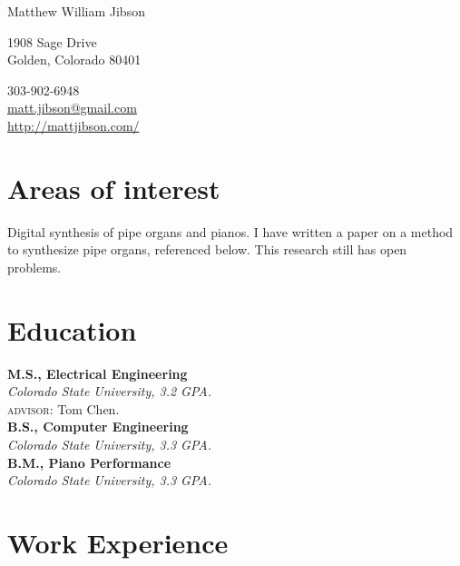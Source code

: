 \documentclass[10pt, a4paper]{article}
\newcommand{\years}[1]{\marginnote{\footnotesize #1}}
\begin{document}
\sloppy

\reversemarginpar
{{\huge Matthew William Jibson}\\[1.0cm]
\parbox{.5\linewidth}{
\vspace{\baselineskip}
1908 Sage Drive\\
Golden, Colorado 80401
}
\parbox{.5\linewidth}{
\begin{flushright}
303-902-6948\\
\href{mailto:matt.jibson@gmail.com}{matt.jibson@gmail.com}\\
\href{http://mattjibson.com/}{http://mattjibson.com/}\\
\end{flushright}
}

\section*{Areas of interest}
Digital synthesis of pipe organs and pianos. I have written a paper on a method to synthesize pipe organs, referenced below. This research still has open problems.

\section*{Education}

\noindent\years{2009}\textbf{M.S., Electrical Engineering}\\
\emph{Colorado State University, 3.2 GPA.} \\
{\small \textsc{advisor:} Tom Chen.}\\[.2cm]
\years{2007}\textbf{B.S., Computer Engineering}\\
\emph{Colorado State University, 3.3 GPA.}\\[.2cm]
\years{2007}\textbf{B.M., Piano Performance}\\
\emph{Colorado State University, 3.3 GPA.}

\section*{Work Experience}

}
\end{document}
